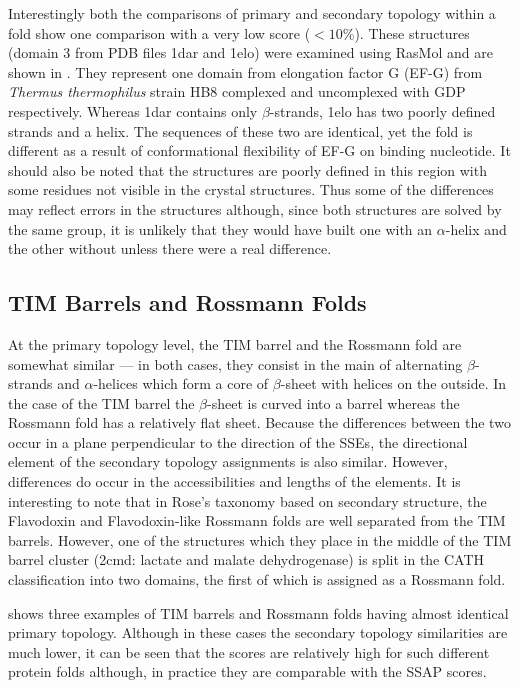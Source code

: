 \documentclass{article}
\begin{document}
Interestingly both the comparisons of primary and secondary topology
within a fold show one comparison with a very low score ($<10$\%).
These structures (domain 3 from PDB files 1dar\cite{al-karadaghi:1dar}
and 1elo\cite{aevarsson:1elo}) were examined using RasMol and are
shown in \figref{\ref{fig:1dar1elo}}. They represent one domain from
elongation factor G (EF-G) from \emph{Thermus thermophilus} strain HB8
complexed and uncomplexed with GDP respectively. Whereas 1dar contains
only $\beta$-strands, 1elo has two poorly defined strands and a
helix. The sequences of these two are identical, yet the fold is
different as a result of conformational flexibility of EF-G on binding
nucleotide.  It should also be noted that the structures are poorly
defined in this region with some residues not visible in the crystal
structures. Thus some of the differences may reflect errors in the
structures although, since both structures are solved by the same
group, it is unlikely that they would have built one with an
$\alpha$-helix and the other without unless there were a real
difference.


\subsection{TIM Barrels and Rossmann Folds}
At the primary topology level, the TIM barrel and the Rossmann fold
are somewhat similar --- in both cases, they consist in the main of
alternating $\beta$-strands and $\alpha$-helices which form a core of
$\beta$-sheet with helices on the outside. In the case of the TIM
barrel the $\beta$-sheet is curved into a barrel whereas the Rossmann
fold has a relatively flat sheet. Because the differences between the
two occur in a plane perpendicular to the direction of the SSEs, the
directional element of the secondary topology assignments is also
similar. However, differences do occur in the accessibilities and
lengths of the elements. It is interesting to note that in Rose's
taxonomy based on secondary structure\cite{przytycka:sstaxonomy}, the
Flavodoxin and Flavodoxin-like Rossmann folds are well separated from
the TIM barrels. However, one of the structures which they place in
the middle of the TIM barrel cluster (2cmd: lactate and malate
dehydrogenase) is split in the CATH classification into two domains,
the first of which is assigned as a Rossmann fold.

\tableref{\ref{tab:timros}} shows three examples of TIM barrels and
Rossmann folds having almost identical primary topology. Although in
these cases the secondary topology similarities are much lower, it can
be seen that the scores are relatively high for such different protein
folds although, in practice they are comparable with the SSAP scores.
\end{document}
